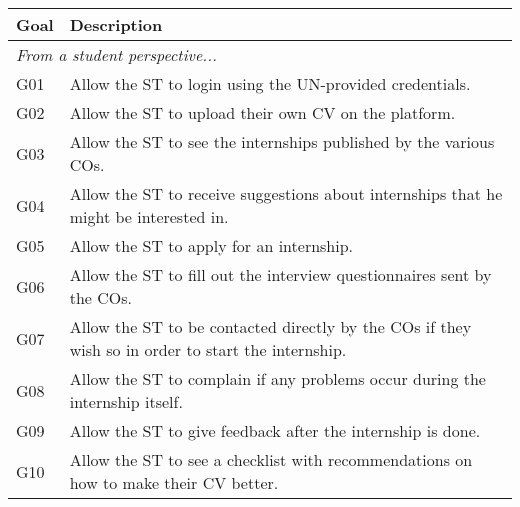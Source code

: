 \begin{longtable}{|l|p{}|}
    \hline
    \textbf{Goal} & \textbf{Description}                                                                                                                              \\
    \hline \hline
    \multicolumn{2}{|l|}{\textit{From a student perspective...}}                                                                                                      \\
    \hline
    G01           & Allow the ST to login using the UN-provided credentials.                                                                                          \\
    \hline
    G02           & Allow the ST to upload their own CV on the platform.                                                                                              \\
    \hline
    G03           & Allow the ST to see the internships published by the various COs.                                                                                 \\
    \hline
    G04           & Allow the ST to receive suggestions about internships that he might be interested in.                                                             \\
    \hline
    G05           & Allow the ST to apply for an internship.                                                                                                          \\
    \hline
    G06           & Allow the ST to fill out the interview questionnaires sent by the COs.                                                                            \\
    \hline
    G07           & Allow the ST to be contacted directly by the COs if they wish so in order to start the internship.                                                \\
    \hline
    G08           & Allow the ST to complain if any problems occur during the internship itself.                                                                      \\
    \hline
    G09           & Allow the ST to give feedback after the internship is done.                                                                                       \\
    \hline
    G10           & Allow the ST to see a checklist with recommendations on how to make their CV better.                                                              \\

\end{longtable}
